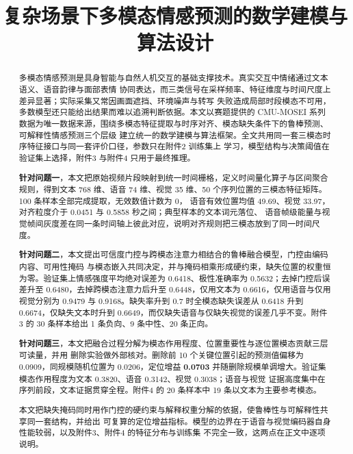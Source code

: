 \documentclass[bwprint]{gmcmthesis}
\title{复杂场景下多模态情感预测的数学建模与算法设计}
\begin{document}
\label{body:start}

\maketitle

\begin{abstract}\label{abstract:start}
多模态情感预测是具身智能与自然人机交互的基础支撑技术。真实交互中情绪通过文本语义、语音韵律与面部表情
协同表达，而三类信号在采样频率、特征维度与时间尺度上差异显著；实际采集又常因画面遮挡、环境噪声与转写
失败造成局部时段模态不可用，多数模型还只能给出结果而难以追溯判断依据。本文以赛题提供的 CMU-MOSEI 系列
数据为唯一数据来源，围绕多模态特征提取与时序对齐、模态缺失条件下的鲁棒预测、可解释性情感预测三个层级
建立统一的数学建模与算法框架。全文共用同一套三模态时序特征接口与同一套评价口径，参数只在附件2 训练集上
学习，模型结构与决策阈值在验证集上选择，附件3 与附件4 只用于最终推理。

\textbf{针对问题一}，本文把原始视频片段映射到统一时间栅格，定义时间量化算子与区间聚合规则，得到文本
768 维、语音 74 维、视觉 35 维、50 个序列位置的三模态特征矩阵。100 条样本全部完成提取，无效数值计数为 0，
语音有效位置均值 49.69、视觉 33.97，对齐粒度介于 0.0451 与 0.5858 秒之间；典型样本的文本词元落位、
语音帧级能量与视觉帧间灰度差在同一条时间轴上彼此对应，说明对齐规则把三模态放到了同一时间尺度。

\textbf{针对问题二}，本文提出可信度门控与跨模态注意力相结合的鲁棒融合模型，门控由编码内容、可用性掩码
与模态嵌入共同决定，并与掩码相乘形成硬约束，缺失位置的权重恒为零。验证集上情感强度平均绝对误差为
0.6418、极性准确率为 0.5632；去掉门控后误差升至 0.6480，去掉跨模态注意力后升至 0.6448，仅用文本为
0.6616，仅用语音与仅用视觉分别为 0.9479 与 0.9168。缺失率升到 0.7 时全模态缺失误差从 0.6418 升到
0.6674，仅缺失文本时升到 0.6649，而仅缺失语音与仅缺失视觉的误差几乎不变。附件3 的 30 条样本给出
1 条负向、9 条中性、20 条正向。

\textbf{针对问题三}，本文把融合过程分解为模态作用程度、位置重要性与逐位置模态贡献三层可读量，并用
删除实验做外部核对。删除前 10 个关键位置引起的预测值偏移为 0.0909，同规模随机位置为 0.0206，定位增益
\textbf{0.0703} 并随删除规模单调增大。验证集模态作用程度为文本 0.3820、语音 0.3142、视觉 0.3038；语音与视觉
证据高度集中在序列前段，文本证据贯穿全程。附件4 的 20 条样本中 19 条以文本为主要参考模态。

本文把缺失掩码同时用作门控的硬约束与解释权重分解的依据，使鲁棒性与可解释性共享同一套结构，并给出
可复算的定位增益指标。模型的边界在于语音与视觉编码器自身性能较弱，以及附件3、附件4 的特征分布与训练集
不完全一致，这两点在正文中逐项说明。
\label{abstract:end}

\end{abstract}
\end{document}

